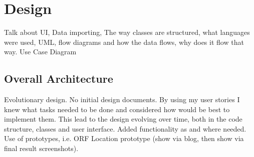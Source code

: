 \chapter{Design}

Talk about UI, Data importing, The way classes are structured, what languages were used, UML, flow diagrams and how the data flows, why does it flow that way. Use Case Diagram




 


\section{Overall Architecture}
Evolutionary design. No initial design documents. By using my user stories I knew what tasks needed to be done and considered how would be best to implement them. This lead to the design evolving over time, both in the code structure, classes and user interface. Added functionality as and where needed. Use of prototypes, i.e. ORF Location prototype (show via blog, then show via final result screenshots).

